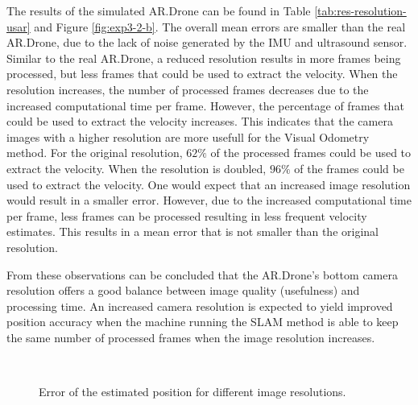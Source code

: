The results of the simulated AR.Drone can be found in Table \ref{tab:res-resolution-usar} and Figure \ref{fig:exp3-2-b}.
The overall mean errors are smaller than the real AR.Drone, due to the lack of noise generated by the IMU and ultrasound sensor.
Similar to the real AR.Drone, a reduced resolution results in more frames being processed, but less frames that could be used to extract the velocity.
When the resolution increases, the number of processed frames decreases due to the increased computational time per frame.
However, the percentage of frames that could be used to extract the velocity increases.
This indicates that the camera images with a higher resolution are more usefull for the Visual Odometry method.
For the original resolution, $62\%$ of the processed frames could be used to extract the velocity. When the resolution is doubled, $96\%$ of the frames could be used to extract the velocity.
One would expect that an increased image resolution would result in a smaller error.
However, due to the increased computational time per frame, less frames can be processed resulting in less frequent velocity estimates.
This results in a mean error that is not smaller than the original resolution.

From these observations can be concluded that the AR.Drone's bottom camera resolution offers a good balance between image quality (usefulness) and processing time.
An increased camera resolution is expected to yield improved position accuracy when the machine running the SLAM method is able to keep the same number of processed frames when the image resolution increases.




\begin{figure}[htb!]
  \begin{center}
\\

 \end{center}
  \caption{Error of the estimated position for different image resolutions.}
  \label{fig:exp3-error}
\end{figure}



